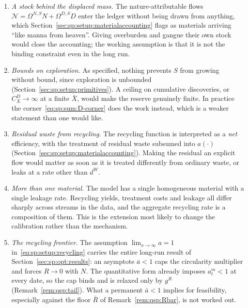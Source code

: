 \begin{enumerate}[leftmargin=2.2em,itemsep=0.25em]
\item \emph{A stock behind the displaced mass.} The nature-attributable flows
$\mathcal N=\Omega^{N,S}N+\Omega^{D,S}D$ enter the ledger without being drawn from anything, which
Section~\ref{sec:sp:setup:materialaccounting} flags as materials arriving ``like manna from heaven''.
Giving overburden and gangue their own stock would close the accounting; the working assumption is
that it is not the binding constraint even in the long run.

\item \emph{Bounds on exploration.} As specified, nothing prevents $S$ from growing without bound,
since exploration is unbounded (Section~\ref{sec:sp:setup:primitives}). A ceiling on cumulative
discoveries, or $C^D_X\to\infty$ at a finite $\bar X$, would make the reserve genuinely finite. In
practice the corner~\eqref{eq:sp:sum:D-corner} does the work instead, which is a weaker statement than
one would like.

\item \emph{Residual waste from recycling.} The recycling function is interpreted as a \emph{net}
efficiency, with the treatment of residual waste subsumed into $a\left(\cdot\right)$
(Section~\ref{sec:sp:setup:materialaccounting}). Making the residual an explicit flow would matter as
soon as it is treated differently from ordinary waste, or leaks at a rate other than $d^W$.

\item \emph{More than one material.} The model has a single homogeneous material with a single
leakage rate. Recycling yields, treatment costs and leakage all differ sharply across streams in the
data, and the aggregate recycling rate is a composition of them. This is the extension most likely to
change the calibration rather than the mechanism.

\item \emph{The recycling frontier.} The assumption $\lim_{x\to\infty}a=1$
in~\eqref{eq:sp:setup:recycling} carries the entire long-run result of
Section~\ref{sec:sp:opt:results}: an asymptote $\bar a<1$ caps the circularity multiplier and forces
$R\to0$ with $N$. The quantitative form already imposes $a^m_t<1$ at every date, so the cap binds and
is relaxed only by $g^R$ (Remark~\ref{rem:qsp:tail}). What a permanent $\bar a<1$ implies for
feasibility, especially against the floor $\bar R$ of Remark~\ref{rem:qsp:Rbar}, is not worked out.


\end{enumerate}
